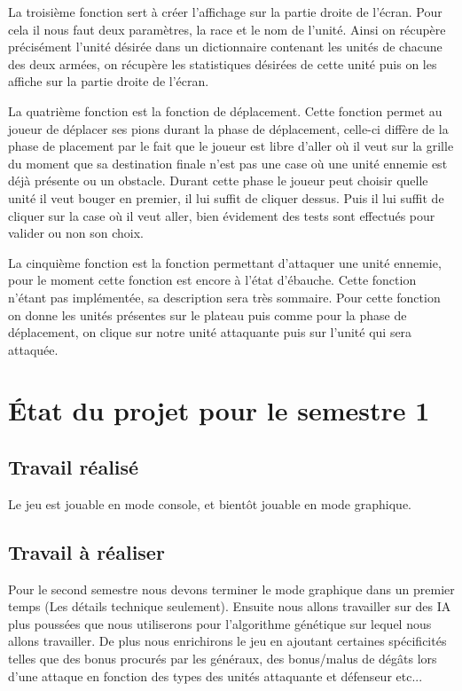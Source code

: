 \documentclass{article}
\begin{document}
	La troisième fonction sert à créer l'affichage sur la partie droite de l'écran. Pour cela il nous faut deux paramètres, la race et le nom de l'unité. Ainsi on récupère précisément l'unité désirée dans un dictionnaire contenant les unités de chacune des deux armées, on récupère les statistiques désirées de cette unité puis on les affiche sur la partie droite de l'écran.
	
	La quatrième fonction est la fonction de déplacement. Cette fonction permet au joueur de déplacer ses pions durant la phase de déplacement, celle-ci diffère de la phase de placement par le fait que le joueur est libre d'aller où il veut sur la grille du moment que sa destination finale n'est pas une case où une unité ennemie est déjà présente ou un obstacle. Durant cette phase le joueur peut choisir quelle unité il veut bouger en premier, il lui suffit de cliquer dessus. Puis il lui suffit de cliquer sur la case où il veut aller, bien évidement des tests sont effectués pour valider ou non son choix.
	
	La cinquième fonction est la fonction permettant d'attaquer une unité ennemie, pour le moment cette fonction est encore à l'état d'ébauche. Cette fonction n'étant pas implémentée, sa description sera très sommaire. Pour cette fonction on donne les unités présentes sur le plateau puis comme pour la phase de déplacement, on clique sur notre unité attaquante puis sur l'unité qui sera attaquée.

\section{État du projet pour le semestre 1}
 \subsection{Travail réalisé}
Le jeu est jouable en mode console, et bientôt jouable en mode graphique. 
 \subsection{Travail à réaliser}
 Pour le second semestre nous devons terminer le mode graphique dans un premier temps (Les détails technique seulement). Ensuite nous allons travailler sur des IA plus poussées que nous utiliserons pour l'algorithme génétique sur lequel nous allons travailler. De plus nous enrichirons le jeu en ajoutant certaines spécificités telles que des bonus procurés par les généraux, des bonus/malus de dégâts lors d'une attaque en fonction des types des unités attaquante et défenseur etc...
\end{document}
